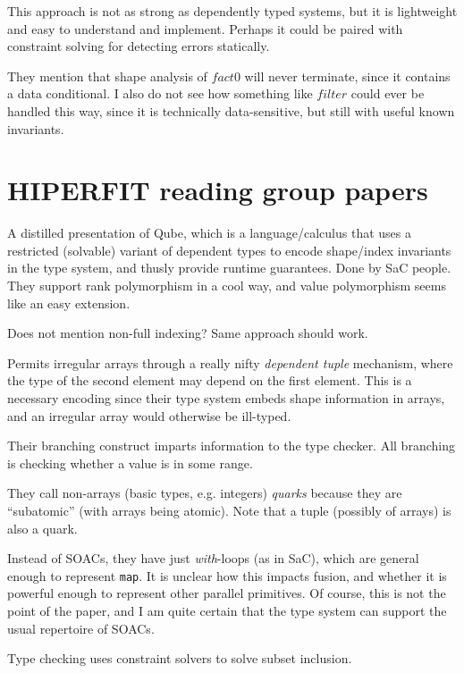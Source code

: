 \documentclass[a4paper, oneside, final]{memoir}
\begin{document}
This approach is not as strong as dependently typed systems, but it is
lightweight and easy to understand and implement.  Perhaps it could be
paired with constraint solving for detecting errors statically.

They mention that shape analysis of $fact 0$ will never terminate,
since it contains a data conditional.  I also do not see how something
like $filter$ could ever be handled this way, since it is technically
data-sensitive, but still with useful known invariants.

\section{HIPERFIT reading group papers}

\begin{quote}
\end{quote}

A distilled presentation of Qube, which is a language/calculus that
uses a restricted (solvable) variant of dependent types to encode
shape/index invariants in the type system, and thusly provide runtime
guarantees.  Done by SaC people.  They support rank polymorphism in a
cool way, and value polymorphism seems like an easy extension.

Does not mention non-full indexing?  Same approach should work.

Permits irregular arrays through a really nifty \textit{dependent
  tuple} mechanism, where the type of the second element may depend on
the first element.  This is a necessary encoding since their type
system embeds shape information in arrays, and an irregular array
would otherwise be ill-typed.

Their branching construct imparts information to the type checker.
All branching is checking whether a value is in some range.

They call non-arrays (basic types, e.g. integers) \textit{quarks}
because they are ``subatomic'' (with arrays being atomic).  Note that
a tuple (possibly of arrays) is also a quark.

Instead of SOACs, they have just \textit{with}-loops (as in SaC),
which are general enough to represent \texttt{map}.  It is unclear how
this impacts fusion, and whether it is powerful enough to represent
other parallel primitives.  Of course, this is not the point of the
paper, and I am quite certain that the type system can support the
usual repertoire of SOACs.

Type checking uses constraint solvers to solve subset inclusion.
\end{document}
